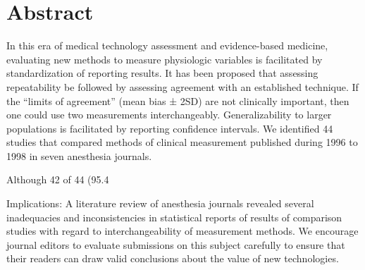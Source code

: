 \documentclass[]{article}
\title{}
\author{}
\begin{document}
\maketitle

\begin{abstract}

\end{abstract}

\section{Abstract}

In this era of medical technology assessment and evidence-based medicine, evaluating new methods to measure physiologic variables is facilitated by standardization of reporting results. It has been proposed that assessing repeatability be followed by assessing agreement with an established technique. If the “limits of agreement” (mean bias ± 2SD) are not clinically important, then one could use two measurements interchangeably. Generalizability to larger populations is facilitated by reporting confidence intervals. We identified 44 studies that compared methods of clinical measurement published during 1996 to 1998 in seven anesthesia journals. 

Although 42 of 44 (95.4%

Implications: A literature review of anesthesia journals revealed several inadequacies and inconsistencies in statistical reports of results of comparison studies with regard to interchangeability of measurement methods. We encourage journal editors to evaluate submissions on this subject carefully to ensure that their readers can draw valid conclusions about the value of new technologies.
\end{document}
